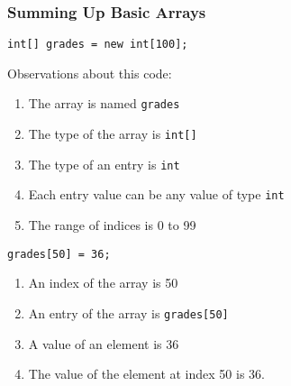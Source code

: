 \begin{frame}

\frametitle{Summing Up Basic Arrays}

\texttt{int[] grades = new int[100];}

Observations about this code:
\begin{enumerate}
\item The array is named \texttt{grades}
\item The type of the array is \texttt{int[]}
\item The type of an entry is \texttt{int}
\item Each entry value can be any value of type \texttt{int}
\item The range of indices is 0 to 99
\setcounter{tmpc}{\theenumi}
\end{enumerate}

\texttt{grades[50] = 36;}

\begin{enumerate}
\setcounter{enumi}{\thetmpc}
\item An index of the array is 50
\item An entry of the array is \texttt{grades[50]}
\item A value of an element is 36
\item The value of the element at index 50 is 36.
\end{enumerate}

\end{frame}




